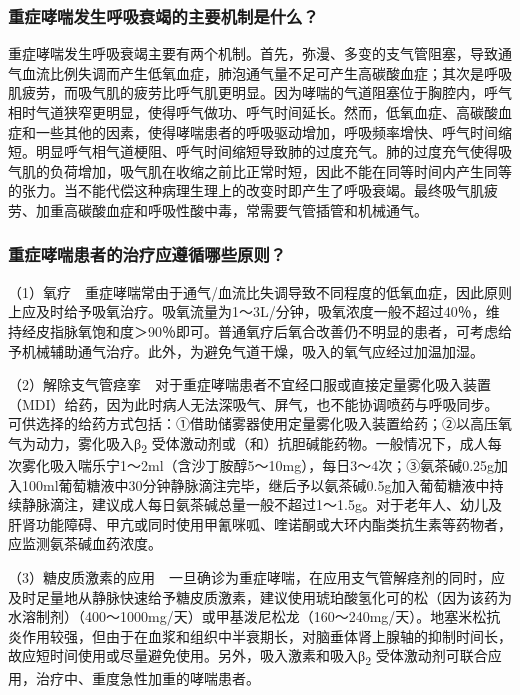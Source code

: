 \subsubsection{重症哮喘发生呼吸衰竭的主要机制是什么？}

重症哮喘发生呼吸衰竭主要有两个机制。首先，弥漫、多变的支气管阻塞，导致通气血流比例失调而产生低氧血症，肺泡通气量不足可产生高碳酸血症；其次是呼吸肌疲劳，而吸气肌的疲劳比呼气肌更明显。因为哮喘的气道阻塞位于胸腔内，呼气相时气道狭窄更明显，使得呼气做功、呼气时间延长。然而，低氧血症、高碳酸血症和一些其他的因素，使得哮喘患者的呼吸驱动增加，呼吸频率增快、呼气时间缩短。明显呼气相气道梗阻、呼气时间缩短导致肺的过度充气。肺的过度充气使得吸气肌的负荷增加，吸气肌在收缩之前比正常时短，因此不能在同等时间内产生同等的张力。当不能代偿这种病理生理上的改变时即产生了呼吸衰竭。最终吸气肌疲劳、加重高碳酸血症和呼吸性酸中毒，常需要气管插管和机械通气。

\subsubsection{重症哮喘患者的治疗应遵循哪些原则？}

（1）氧疗　重症哮喘常由于通气/血流比失调导致不同程度的低氧血症，因此原则上应及时给予吸氧治疗。吸氧流量为1～3L/分钟，吸氧浓度一般不超过40％，维持经皮指脉氧饱和度＞90％即可。普通氧疗后氧合改善仍不明显的患者，可考虑给予机械辅助通气治疗。此外，为避免气道干燥，吸入的氧气应经过加温加湿。

（2）解除支气管痉挛　对于重症哮喘患者不宜经口服或直接定量雾化吸入装置（MDI）给药，因为此时病人无法深吸气、屏气，也不能协调喷药与呼吸同步。可供选择的给药方式包括：①借助储雾器使用定量雾化吸入装置给药；②以高压氧气为动力，雾化吸入β\textsubscript{2}
受体激动剂或（和）抗胆碱能药物。一般情况下，成人每次雾化吸入喘乐宁1～2ml（含沙丁胺醇5～10mg），每日3～4次；③氨茶碱0.25g加入100ml葡萄糖液中30分钟静脉滴注完毕，继后予以氨茶碱0.5g加入葡萄糖液中持续静脉滴注，建议成人每日氨茶碱总量一般不超过1～1.5g。对于老年人、幼儿及肝肾功能障碍、甲亢或同时使用甲氰咪呱、喹诺酮或大环内酯类抗生素等药物者，应监测氨茶碱血药浓度。

（3）糖皮质激素的应用　一旦确诊为重症哮喘，在应用支气管解痉剂的同时，应及时足量地从静脉快速给予糖皮质激素，建议使用琥珀酸氢化可的松（因为该药为水溶制剂）（400～1000mg/天）或甲基泼尼松龙（160～240mg/天）。地塞米松抗炎作用较强，但由于在血浆和组织中半衰期长，对脑垂体肾上腺轴的抑制时间长，故应短时间使用或尽量避免使用。另外，吸入激素和吸入β\textsubscript{2}
受体激动剂可联合应用，治疗中、重度急性加重的哮喘患者。

